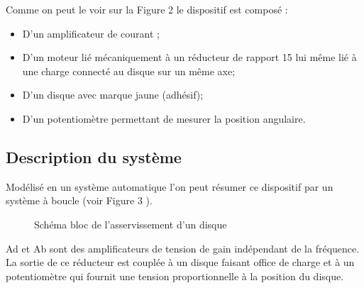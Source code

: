 	
	
Comme on peut le voir sur la Figure 2 le dispositif est composé :

\begin{itemize}
	\item D'un amplificateur de courant ;
	\item D'un moteur lié mécaniquement à un réducteur de rapport 15 lui même lié à une charge connecté au disque sur un même axe;
	\item D'un disque avec marque jaune (adhésif);
	\item D'un potentiomètre permettant de mesurer la position angulaire.
\end{itemize}

\newpage
\subsection{Description du système}

\noindent
Modélisé en un système automatique l'on peut résumer ce dispositif par un système à boucle (voir Figure 3 ).

\begin{figure}[h!]
	\centering
	\caption{Schéma bloc de l'asservissement d'un disque}
\end{figure}
\noindent
Ad et Ab sont des amplificateurs de tension de gain indépendant de la fréquence.
\vspace{0.5cm}\\
\noindent
La sortie de ce réducteur  est couplée  à un disque faisant office de charge et à un potentiomètre qui fournit une tension proportionnelle à la position du disque. 

